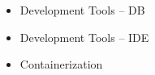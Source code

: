 \begin{itemize}
    \item \textcolor{emphasis}{Development Tools -- DB}
\end{itemize}
\divider\smallskip

\begin{itemize}
    \item \textcolor{emphasis}{Development Tools -- IDE}
\end{itemize}
\divider\smallskip

\begin{itemize}
    \item \textcolor{emphasis}{Containerization}
\end{itemize}
\divider\smallskip



